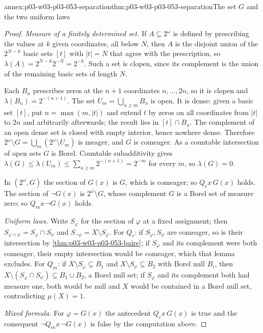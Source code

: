 \begin{annexitem}{annex:p03-w03-p03-053-separation}{thm:p03-w03-p03-053-separation}{The set \(G\) and the two uniform laws}
\begin{proof}
\emph{Measure of a finitely determined set.} If \(A\subseteq2^\omega\) is
defined by prescribing the values at \(k\) given coordinates, all below
\(N\), then \(A\) is the disjoint union of the \(2^{N-k}\) basic sets
\([t]\) with \(|t|=N\) that agree with the prescription, so
\(\lambda(A)=2^{N-k}2^{-N}=2^{-k}\). Such a set is clopen, since its
complement is the union of the remaining basic sets of length \(N\).

Each \(B_n\) prescribes zeros at the \(n+1\) coordinates
\(n,\ldots,2n\), so it is clopen and \(\lambda(B_n)=2^{-(n+1)}\). The set
\(U_m=\bigcup_{n\ge m}B_n\) is open. It is dense: given a basic set
\([t]\), put \(n=\max(m,|t|)\) and extend \(t\) by zeros on all
coordinates from \(|t|\) to \(2n\) and arbitrarily afterwards; the result
lies in \([t]\cap B_n\). The complement of an open dense set is closed
with empty interior, hence nowhere dense. Therefore
\(2^\omega\setminus G=\bigcup_m(2^\omega\setminus U_m)\) is meager, and
\(G\) is comeager. As a countable intersection of open sets \(G\) is
Borel. Countable subadditivity gives
\(\lambda(G)\le\lambda(U_m)\le\sum_{n\ge m}2^{-(n+1)}=2^{-m}\) for every
\(m\), so \(\lambda(G)=0\).

In \((2^\omega,G)\) the section of \(G(x)\) is \(G\), which is comeager;
so \(Q_cx\,G(x)\) holds. The section of \(\neg G(x)\) is
\(2^\omega\setminus G\), whose complement \(G\) is a Borel set of measure
zero; so \(Q_mx\,\neg G(x)\) holds.

\emph{Uniform laws.} Write \(S_\varphi\) for the section of \(\varphi\)
at a fixed assignment; then \(S_{\varphi\land\psi}=S_\varphi\cap S_\psi\)
and \(S_{\neg\varphi}=X\setminus S_\varphi\). For \(Q_c\): if
\(S_\varphi,S_\psi\) are comeager, so is their intersection by
\cref{thm:p03-w03-p03-053-baire}; if \(S_\varphi\) and its complement were
both comeager, their empty intersection would be comeager, which that
lemma excludes. For \(Q_m\): if \(X\setminus S_\varphi\subseteq B_1\) and
\(X\setminus S_\psi\subseteq B_2\) with Borel null \(B_i\), then
\(X\setminus(S_\varphi\cap S_\psi)\subseteq B_1\cup B_2\), a Borel null
set; if \(S_\varphi\) and its complement both had measure one, both would
be null and \(X\) would be contained in a Borel null set, contradicting
\(\mu(X)=1\).

\emph{Mixed formula.} For \(\varphi=G(x)\) the antecedent
\(Q_cx\,G(x)\) is true and the consequent \(\neg Q_mx\,\neg G(x)\) is
false by the computation above.
\end{proof}
\end{annexitem}

